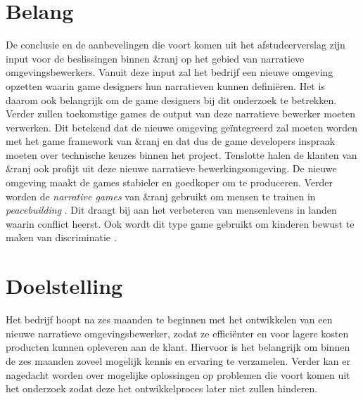 \documentclass{report}
\newcommand{\organisation}{\&ranj}
\begin{document}
\section{Belang}
De conclusie en de aanbevelingen die voort komen uit het afstudeerverslag zijn input voor de beslissingen binnen \organisation{} op het gebied van narratieve omgevingsbewerkers. Vanuit deze input zal het bedrijf een nieuwe omgeving opzetten waarin game designers hun narratieven kunnen defini{\"e}ren. Het is daarom ook belangrijk om de game designers bij dit onderzoek te betrekken. Verder zullen toekomstige games de output van deze narratieve bewerker moeten verwerken. Dit betekend dat de nieuwe omgeving ge{\"i}ntegreerd zal moeten worden met het game framework van \organisation{} en dat dus de game developers inspraak moeten over technische keuzes binnen het project. Tenslotte halen de klanten van \organisation{} ook profijt uit deze nieuwe narratieve bewerkingsomgeving. De nieuwe omgeving maakt de games stabieler en goedkoper om te produceren.
Verder worden de \emph{narrative games} van \organisation{} gebruikt om mensen te trainen in \emph{peacebuilding} \cite{missionzhobiaorg}. Dit draagt bij aan het verbeteren van mensenlevens in landen waarin conflict heerst. 
Ook wordt dit type game gebruikt om kinderen bewust te maken van discriminatie \cite{fairplay}.

\section{Doelstelling} %
Het bedrijf hoopt na zes maanden te beginnen met het ontwikkelen van een nieuwe narratieve omgevingsbewerker, zodat ze effici{\"e}nter en voor lagere kosten producten kunnen opleveren aan de klant. Hiervoor is het belangrijk om binnen de zes maanden zoveel mogelijk kennis en ervaring te verzamelen. Verder kan er nagedacht worden over mogelijke oplossingen op problemen die voort komen uit het onderzoek zodat deze het ontwikkelproces later niet zullen hinderen.
\end{document}
